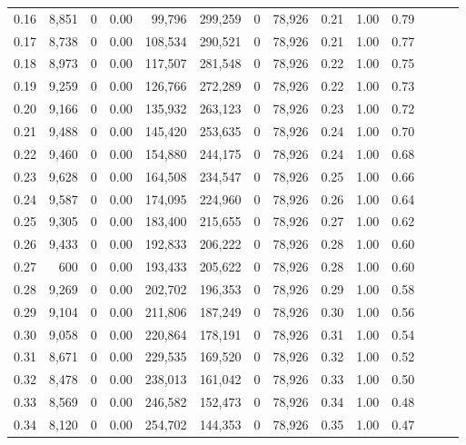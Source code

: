 \begin{tabular}{rrrrrrrrrrrrrr}
0.16 &  8,851 &      0 &  0.00 &   99,796 &  299,259 &       0 &  78,926 &  0.21 &  1.00 &      0.79 \\
0.17 &  8,738 &      0 &  0.00 &  108,534 &  290,521 &       0 &  78,926 &  0.21 &  1.00 &      0.77 \\
0.18 &  8,973 &      0 &  0.00 &  117,507 &  281,548 &       0 &  78,926 &  0.22 &  1.00 &      0.75 \\
0.19 &  9,259 &      0 &  0.00 &  126,766 &  272,289 &       0 &  78,926 &  0.22 &  1.00 &      0.73 \\
0.20 &  9,166 &      0 &  0.00 &  135,932 &  263,123 &       0 &  78,926 &  0.23 &  1.00 &      0.72 \\
0.21 &  9,488 &      0 &  0.00 &  145,420 &  253,635 &       0 &  78,926 &  0.24 &  1.00 &      0.70 \\
0.22 &  9,460 &      0 &  0.00 &  154,880 &  244,175 &       0 &  78,926 &  0.24 &  1.00 &      0.68 \\
0.23 &  9,628 &      0 &  0.00 &  164,508 &  234,547 &       0 &  78,926 &  0.25 &  1.00 &      0.66 \\
0.24 &  9,587 &      0 &  0.00 &  174,095 &  224,960 &       0 &  78,926 &  0.26 &  1.00 &      0.64 \\
0.25 &  9,305 &      0 &  0.00 &  183,400 &  215,655 &       0 &  78,926 &  0.27 &  1.00 &      0.62 \\
0.26 &  9,433 &      0 &  0.00 &  192,833 &  206,222 &       0 &  78,926 &  0.28 &  1.00 &      0.60 \\
0.27 &    600 &      0 &  0.00 &  193,433 &  205,622 &       0 &  78,926 &  0.28 &  1.00 &      0.60 \\
0.28 &  9,269 &      0 &  0.00 &  202,702 &  196,353 &       0 &  78,926 &  0.29 &  1.00 &      0.58 \\
0.29 &  9,104 &      0 &  0.00 &  211,806 &  187,249 &       0 &  78,926 &  0.30 &  1.00 &      0.56 \\
0.30 &  9,058 &      0 &  0.00 &  220,864 &  178,191 &       0 &  78,926 &  0.31 &  1.00 &      0.54 \\
0.31 &  8,671 &      0 &  0.00 &  229,535 &  169,520 &       0 &  78,926 &  0.32 &  1.00 &      0.52 \\
0.32 &  8,478 &      0 &  0.00 &  238,013 &  161,042 &       0 &  78,926 &  0.33 &  1.00 &      0.50 \\
0.33 &  8,569 &      0 &  0.00 &  246,582 &  152,473 &       0 &  78,926 &  0.34 &  1.00 &      0.48 \\
0.34 &  8,120 &      0 &  0.00 &  254,702 &  144,353 &       0 &  78,926 &  0.35 &  1.00 &      0.47 \\

\end{tabular}
